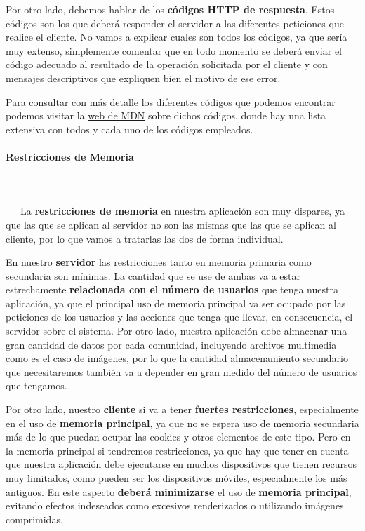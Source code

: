 Por otro lado, debemos hablar de los \textbf{códigos HTTP de respuesta}. Estos códigos son los que deberá responder el servidor a las diferentes peticiones que realice el cliente. No vamos a explicar cuales son todos los códigos, ya que sería muy extenso, simplemente comentar que en todo momento se deberá enviar el código adecuado al resultado de la operación solicitada por el cliente y con mensajes descriptivos que expliquen bien el motivo de ese error. 

Para consultar con más detalle los diferentes códigos que podemos encontrar podemos visitar la \href{https://developer.mozilla.org/en-US/docs/Web/HTTP/Status}{web de MDN} sobre dichos códigos, donde hay una lista extensiva con todos y cada uno de los códigos empleados.

\paragraph{Restricciones de Memoria}
~\\\\
\-\ \-\ \-\ La \textbf{restricciones de memoria} en nuestra aplicación son muy dispares, ya que las que se aplican al servidor no son las mismas que las que se aplican al cliente, por lo que vamos a tratarlas las dos de forma individual.

En nuestro \textbf{servidor} las restricciones tanto en memoria primaria como secundaria son mínimas. La cantidad que se use de ambas va a estar estrechamente \textbf{relacionada con el número de usuarios} que tenga nuestra aplicación, ya que el principal uso de memoria principal va ser ocupado por las peticiones de los usuarios y las acciones que tenga que llevar, en consecuencia, el servidor sobre el sistema. Por otro lado, nuestra aplicación debe almacenar una gran cantidad de datos por cada comunidad, incluyendo archivos multimedia como es el caso de imágenes, por lo que la cantidad almacenamiento secundario que necesitaremos también va a depender en gran medido del número de usuarios que tengamos.

Por otro lado, nuestro \textbf{cliente} si va a tener \textbf{fuertes restricciones}, especialmente en el uso de\textbf{ memoria principal}, ya que no se espera uso de memoria secundaria más de lo que puedan ocupar las cookies y otros elementos de este tipo. Pero en la memoria principal si tendremos restricciones, ya que hay que tener en cuenta que nuestra aplicación debe ejecutarse en muchos dispositivos que tienen recursos muy limitados, como pueden ser los dispositivos móviles, especialmente los más antiguos. En este aspecto \textbf{deberá minimizarse} el uso de \textbf{memoria principal}, evitando efectos indeseados como excesivos renderizados o utilizando imágenes comprimidas.

